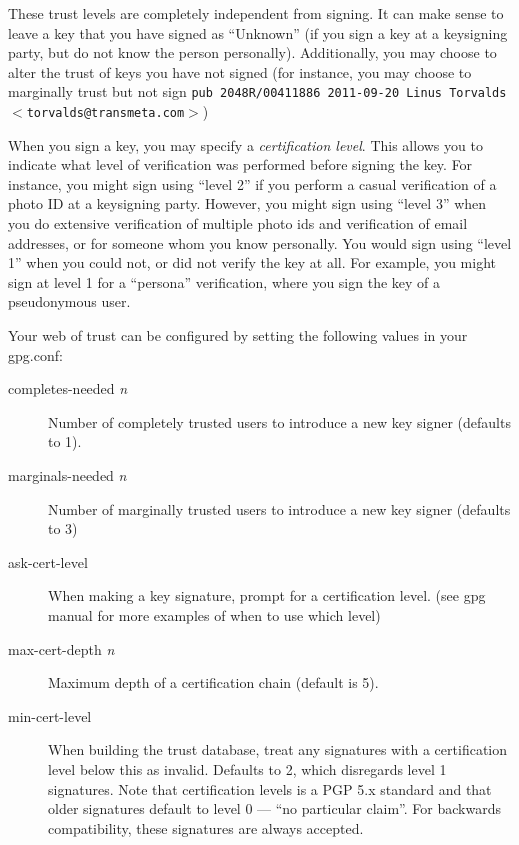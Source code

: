\documentclass[letterpaper]{article}
\renewcommand{\_}[1]{\ifmmode_{_{#1}}\else\underline{\phantom{n}}$\,$#1\fi}
\begin{document}
These trust levels are completely independent from signing. It can make
sense to leave a key that you have signed as ``Unknown'' (if you sign a key
at a keysigning party, but do not know the person personally).
Additionally, you may choose to alter the trust of keys you have not signed
(for instance, you may choose to marginally trust but not sign
\texttt{pub  2048R/00411886 2011-09-20 Linus Torvalds $<$torvalds@transmeta.com$>$})


When you sign a key, you may specify a \textsl{certification level}. This
allows you to indicate what level of verification was performed before
signing the key. For instance, you might sign using ``level 2'' if you
perform a casual verification of a photo ID at a keysigning party. However,
you might sign using ``level 3'' when you do extensive verification of
multiple photo ids and verification of email addresses, or for someone whom
you know personally. You would sign using ``level 1'' when you could not,
or did not verify the key at all. For example, you might sign at level 1
for a ``persona'' verification, where you sign the key of a pseudonymous
user.

Your web of trust can be configured by setting the following values in your gpg.conf:

\begin{description}
\item[completes-needed \textsl{n}] Number of completely trusted users to introduce a
  new key signer (defaults to 1).

\item[marginals-needed \textsl{n}] Number of marginally trusted users to introduce a
  new key signer (defaults to 3)

\item[ask-cert-level] When making a key signature, prompt for a
  certification level. (see gpg manual for more examples of when to use
  which level)


\item[max-cert-depth \textsl{n}] Maximum depth of a certification chain (default is
  5).

\item[min-cert-level] When building the trust database, treat any
  signatures with a certification level below this as invalid. Defaults to
  2, which disregards level 1 signatures. Note that certification levels is
  a PGP 5.x standard and that older signatures default to level 0 --- ``no
  particular claim''. For backwards compatibility, these signatures are
  always accepted.
\end{description}
\end{document}

